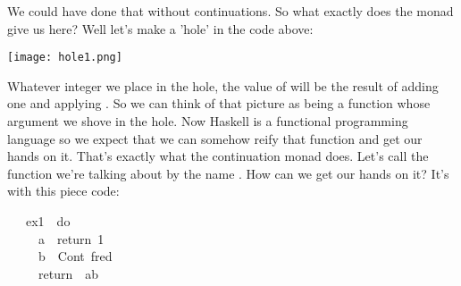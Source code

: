 \documentclass[12pt]{article}
\begin{document}
We could have done that without continuations. So what exactly does the  monad give us here? Well let's make a 'hole' in the code above:

\begin{center}
\texttt{[image: hole1.png]}
\end{center}

Whatever integer we place in the hole, the value of  will be the result of adding one and applying . So we can think of that picture as being a function whose argument we shove in the hole. Now Haskell is a functional programming language so we expect that we can somehow reify that function and get our hands on it. That's exactly what the continuation monad  does. Let's call the function we're talking about by the name . How can we get our hands on it? It's with this piece code:

\begin{tabbing}\ttfamily
~~~ex1~~do\\
\ttfamily ~~~~~a~~return~1\\
\ttfamily ~~~~~b~~Cont~fred~~\\
\ttfamily ~~~~~return~~ab
\end{tabbing}
\end{document}
